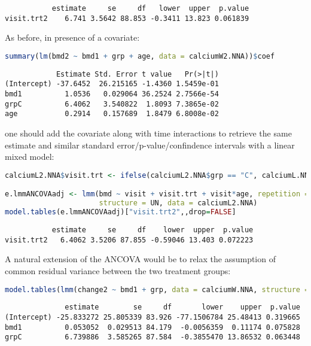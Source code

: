 \documentclass[12pt]{article}
\begin{document}
\label{}
\begin{verbatim}
           estimate     se     df   lower  upper  p.value
visit.trt2    6.741 3.5642 88.853 -0.3411 13.823 0.061839
\end{verbatim}


As before, in presence of a covariate:
\begin{lstlisting}[language=r,numbers=none]
summary(lm(bmd2 ~ bmd1 + grp + age, data = calciumW2.NNA))$coef
\end{lstlisting}

\label{}
\begin{verbatim}
            Estimate Std. Error t value   Pr(>|t|)
(Intercept) -37.6452  26.215165 -1.4360 1.5459e-01
bmd1          1.0536   0.029064 36.2524 2.7566e-54
grpC          6.4062   3.540822  1.8093 7.3865e-02
age           0.2914   0.157689  1.8479 6.8008e-02
\end{verbatim}


one should add the covariate along with time interactions to retrieve
the same estimate and similar standard error/p-value/confindence
intervals with a linear mixed model:
\begin{lstlisting}[language=r,numbers=none]
calciumL2.NNA$visit.trt <- ifelse(calciumL2.NNA$grp == "C", calciumL.NNA$visit, "1")

e.lmmANCOVAadj <- lmm(bmd ~ visit + visit.trt + visit*age, repetition = ~visit|girl,
                      structure = UN, data = calciumL2.NNA)
model.tables(e.lmmANCOVAadj)["visit.trt2",,drop=FALSE]
\end{lstlisting}

\label{}
\begin{verbatim}
           estimate     se     df    lower  upper  p.value
visit.trt2   6.4062 3.5206 87.855 -0.59046 13.403 0.072223
\end{verbatim}


\clearpage


\noindent A natural extension of the ANCOVA would be to relax the
assumption of common residual variance between the two treatment
groups:
\begin{lstlisting}[language=r,numbers=none]
model.tables(lmm(change2 ~ bmd1 + grp, data = calciumW.NNA, structure = IND(~grp)))
\end{lstlisting}

\label{}
\begin{verbatim}
              estimate        se     df       lower    upper  p.value
(Intercept) -25.833272 25.805339 83.926 -77.1506784 25.48413 0.319665
bmd1          0.053052  0.029513 84.179  -0.0056359  0.11174 0.075828
grpC          6.739886  3.585265 87.584  -0.3855470 13.86532 0.063448
\end{verbatim}
\end{document}
